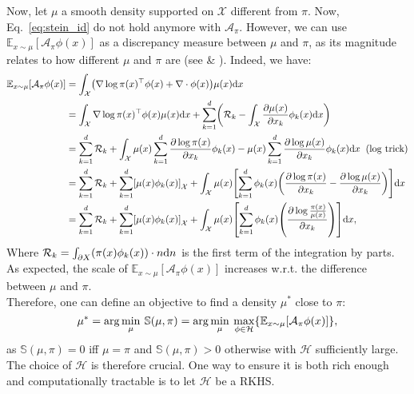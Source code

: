 \documentclass[runningheads,a4paper]{llncs}
\newcommand{\E}{\mathbb{E}}
\newcommand{\Sr}{\mathbb{S}}
\newcommand{\X}{\mathcal{X}}
\newcommand{\A}{\mathcal{A}}
\newcommand{\Hr}{\mathcal{H}}
\newcommand{\diff}[2]{\frac{\partial #1}{\partial #2}}
\newcommand{\dr}{\mathrm{d}}
\DeclarePairedDelimiter{\pare}{(}{)}
\DeclarePairedDelimiter{\bra}{\{}{\}}
\DeclarePairedDelimiter{\sq}{[}{]}
\begin{document}
Now, let $\mu$ a smooth density supported on $\X$ different from $\pi$. Now, Eq.~\ref{eq:stein_id} do not hold
anymore with $\A_\pi$. However, we can use $\E_{x \sim \mu}[\A_\pi \phi (x)]$ as a discrepancy
measure between $\mu$ and $\pi$, as its magnitude relates to how different $\mu$ and $\pi$ are
(see \cite{https://doi.org/10.48550/arxiv.1608.04471} \& \cite{https://doi.org/10.48550/arxiv.1704.07520}).
Indeed, we have:
\begin{equation}
  \begin{split}
    \E_{x \sim \mu}[\A_\pi \phi (x)] &=
      \int_\X \pare*{ \nabla \log \pi(x)^\top \phi(x) + \nabla \cdot \phi(x) } \mu(x) \dr x \\
    &= \int_\X \nabla \log \pi(x)^\top \phi(x) \mu(x) \dr x +
    \sum_{k=1}^d \pare*{ \mathcal{R}_k - \int_\X \diff{\mu(x)}{x_k} \phi_k(x) \dr x} \\
    &= \sum_{k=1}^d \mathcal{R}_k +
      \int_\X  \mu(x) \sum_{k=1}^d \diff{\log \pi(x)}{x_k}\phi_k(x) -
    \mu(x) \sum_{k=1}^d \diff{\log \mu(x)}{x_k} \phi_k(x) \dr x \;\; \text{(log trick)} \\
    &= \sum_{k=1}^d \mathcal{R}_k +
      \sum_{k=1}^d \sq*{\mu(x) \phi_k(x)}_\X + \int_\X  \mu(x) \sq*{ \sum_{k=1}^d \phi_k(x) \pare*{ \diff{\log \pi(x)}{x_k} - \diff{\log \mu(x)}{x_k}}} \dr x \\
    &= \sum_{k=1}^d \mathcal{R}_k +
      \sum_{k=1}^d \sq*{\mu(x) \phi_k(x)}_\X + \int_\X  \mu(x) \sq*{ \sum_{k=1}^d \phi_k(x) \pare*{ \diff{\log \frac{\pi(x)}{\mu(x)}}{x_k}}} \dr x,
  \end{split}
\end{equation}
Where $\mathcal{R}_k = \int_{\partial X}\pare*{\pi(x) \phi_k(x)} \cdot n \dr n$
is the first term of the integration by parts.
As expected, the scale of $\E_{x \sim \mu}[\A_\pi \phi (x)]$ increases w.r.t. the difference between $\mu$ and $\pi$.\\

Therefore, one can define an objective to find a density $\mu^*$ close to $\pi$:
\begin{equation}
  \mu^* = \arg\min_{\mu} \: \Sr(\mu, \pi) =
    \arg\min_{\mu} \: \max_{\phi \in \Hr} \bra*{ \E_{x \sim \mu}[\A_\pi \phi (x)] },
  \label{eq:stein_obj}
\end{equation}
as $\Sr(\mu, \pi) = 0$ iff $\mu = \pi$ and $\Sr(\mu, \pi) > 0$ otherwise with $\Hr$ sufficiently large.
The choice of $\Hr$ is therefore crucial. One way to ensure it is both rich enough and computationally tractable
is to let $\Hr$ be a RKHS.
\end{document}
